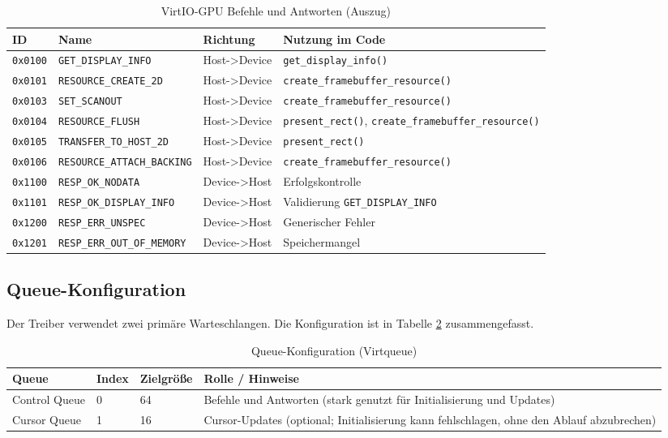 \begin{table}[ht]
\centering
\caption{VirtIO-GPU Befehle und Antworten (Auszug)}
\label{tab:virtio_commands}
\begin{tabular}{l l l l}
\toprule
\textbf{ID} & \textbf{Name} & \textbf{Richtung} & \textbf{Nutzung im Code} \\ \midrule
\texttt{0x0100} & \texttt{GET\_DISPLAY\_INFO} & Host->Device & \texttt{get\_display\_info()} \\
\texttt{0x0101} & \texttt{RESOURCE\_CREATE\_2D} & Host->Device & \texttt{create\_framebuffer\_resource()} \\
\texttt{0x0103} & \texttt{SET\_SCANOUT} & Host->Device & \texttt{create\_framebuffer\_resource()} \\
\texttt{0x0104} & \texttt{RESOURCE\_FLUSH} & Host->Device & \texttt{present\_rect()}, \texttt{create\_framebuffer\_resource()} \\
\texttt{0x0105} & \texttt{TRANSFER\_TO\_HOST\_2D} & Host->Device & \texttt{present\_rect()} \\
\texttt{0x0106} & \texttt{RESOURCE\_ATTACH\_BACKING} & Host->Device & \texttt{create\_framebuffer\_resource()} \\
\texttt{0x1100} & \texttt{RESP\_OK\_NODATA} & Device->Host & Erfolgskontrolle \\
\texttt{0x1101} & \texttt{RESP\_OK\_DISPLAY\_INFO} & Device->Host & Validierung \texttt{GET\_DISPLAY\_INFO} \\
\texttt{0x1200} & \texttt{RESP\_ERR\_UNSPEC} & Device->Host & Generischer Fehler \\
\texttt{0x1201} & \texttt{RESP\_ERR\_OUT\_OF\_MEMORY} & Device->Host & Speichermangel \\ \bottomrule
\end{tabular}
\end{table}

\subsection{Queue-Konfiguration}

Der Treiber verwendet zwei primäre Warteschlangen. Die Konfiguration ist in
Tabelle \ref{tab:virtio_queues} zusammengefasst.

\begin{table}[ht]
\centering
\caption{Queue-Konfiguration (Virtqueue)}
\label{tab:virtio_queues}
\begin{tabular}{l l l l}
\toprule
\textbf{Queue} & \textbf{Index} & \textbf{Zielgröße} & \textbf{Rolle / Hinweise} \\ \midrule
Control Queue & 0 & 64 & Befehle und Antworten (stark genutzt für Initialisierung und Updates) \\
Cursor Queue & 1 & 16 & Cursor-Updates (optional; Initialisierung kann fehlschlagen, ohne den Ablauf abzubrechen) \\ \bottomrule
\end{tabular}
\end{table}

